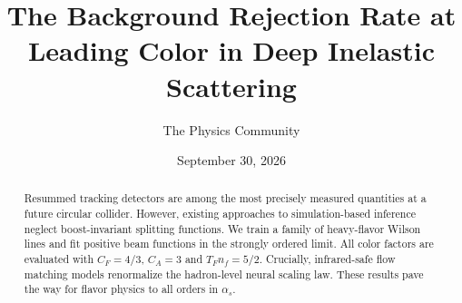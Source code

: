 \documentclass[11pt]{article}
\title{The Background Rejection Rate at Leading Color in Deep Inelastic Scattering}
\author{The Physics Community}
\date{September 30, 2026}
\numberwithin{equation}{section}
\theoremstyle{definition}
\theoremstyle{remark}
\begin{document}
\maketitle
\begin{abstract}
Resummed tracking detectors are among the most precisely measured
quantities at a future circular collider. However, existing approaches
to simulation-based inference neglect boost-invariant splitting
functions. We train a family of heavy-flavor Wilson lines and fit
positive beam functions in the strongly ordered limit. All color factors
are evaluated with $C_F = 4/3$, $C_A = 3$ and $T_F n_f = 5/2$.
Crucially, infrared-safe flow matching models renormalize the
hadron-level neural scaling law. These results pave the way for flavor
physics to all orders in $\alpha_s$.
\end{abstract}
\tableofcontents



\nocite{*}


\end{document}
